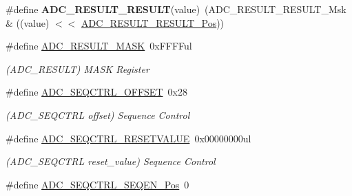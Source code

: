 \begin{DoxyCompactItemize}
\item 
\hypertarget{group___s_a_m_l21___a_d_c_ga2e9530a4b85ad58c5d84e4e44adeb9e3}{}\#define {\bfseries A\+D\+C\+\_\+\+R\+E\+S\+U\+L\+T\+\_\+\+R\+E\+S\+U\+L\+T}(value)~(A\+D\+C\+\_\+\+R\+E\+S\+U\+L\+T\+\_\+\+R\+E\+S\+U\+L\+T\+\_\+\+Msk \& ((value) $<$$<$ \hyperlink{group___s_a_m_l21___a_d_c_ga32c8bee520d5fa7ad752a631166250f8}{A\+D\+C\+\_\+\+R\+E\+S\+U\+L\+T\+\_\+\+R\+E\+S\+U\+L\+T\+\_\+\+Pos}))\label{group___s_a_m_l21___a_d_c_ga2e9530a4b85ad58c5d84e4e44adeb9e3}

\item 
\hypertarget{group___s_a_m_l21___a_d_c_gafe06255d0d878f4218e65dabbc21c87a}{}\#define \hyperlink{group___s_a_m_l21___a_d_c_gafe06255d0d878f4218e65dabbc21c87a}{A\+D\+C\+\_\+\+R\+E\+S\+U\+L\+T\+\_\+\+M\+A\+S\+K}~0x\+F\+F\+F\+Ful\label{group___s_a_m_l21___a_d_c_gafe06255d0d878f4218e65dabbc21c87a}

\begin{DoxyCompactList}\small\item\em (A\+D\+C\+\_\+\+R\+E\+S\+U\+L\+T) M\+A\+S\+K Register \end{DoxyCompactList}\item 
\hypertarget{group___s_a_m_l21___a_d_c_ga3abf09318a3ac3968ff9fc456857c328}{}\#define \hyperlink{group___s_a_m_l21___a_d_c_ga3abf09318a3ac3968ff9fc456857c328}{A\+D\+C\+\_\+\+S\+E\+Q\+C\+T\+R\+L\+\_\+\+O\+F\+F\+S\+E\+T}~0x28\label{group___s_a_m_l21___a_d_c_ga3abf09318a3ac3968ff9fc456857c328}

\begin{DoxyCompactList}\small\item\em (A\+D\+C\+\_\+\+S\+E\+Q\+C\+T\+R\+L offset) Sequence Control \end{DoxyCompactList}\item 
\hypertarget{group___s_a_m_l21___a_d_c_ga8d0b8d451d5bbf817ff24219f6e7c6c6}{}\#define \hyperlink{group___s_a_m_l21___a_d_c_ga8d0b8d451d5bbf817ff24219f6e7c6c6}{A\+D\+C\+\_\+\+S\+E\+Q\+C\+T\+R\+L\+\_\+\+R\+E\+S\+E\+T\+V\+A\+L\+U\+E}~0x00000000ul\label{group___s_a_m_l21___a_d_c_ga8d0b8d451d5bbf817ff24219f6e7c6c6}

\begin{DoxyCompactList}\small\item\em (A\+D\+C\+\_\+\+S\+E\+Q\+C\+T\+R\+L reset\+\_\+value) Sequence Control \end{DoxyCompactList}\item 
\hypertarget{group___s_a_m_l21___a_d_c_ga90766a8cbd7466974d345edb2f668b74}{}\#define \hyperlink{group___s_a_m_l21___a_d_c_ga90766a8cbd7466974d345edb2f668b74}{A\+D\+C\+\_\+\+S\+E\+Q\+C\+T\+R\+L\+\_\+\+S\+E\+Q\+E\+N\+\_\+\+Pos}~0\label{group___s_a_m_l21___a_d_c_ga90766a8cbd7466974d345edb2f668b74}


\end{DoxyCompactItemize}
